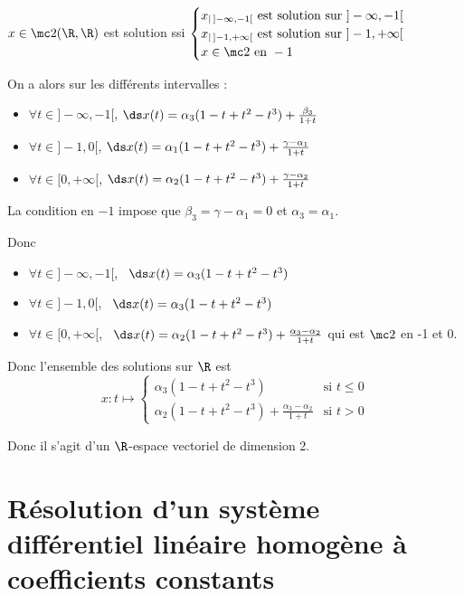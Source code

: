 \begin{exemple}
    $x \in \mc 2 (\R, \R)$ est solution ssi 
    $\begin{cases}
        x_{|\,]-\infty, -1[} \text{ est solution sur } ]-\infty, -1[ \\
        x_{|\,]-1, + \infty[} \text{ est solution sur } ]-1, +\infty[ \\
        x \in \mc 2 \text{ en } -1
    \end{cases}$

    On a alors sur les différents intervalles :
    \begin{itemize}
        \item $\forall t \in ]-\infty, -1[$, $\ds x(t) = \alpha_3 (1 - t + t^2 - t^3) + \frac{\beta_3} {1 + t}$
        \item $\forall t \in ]-1, 0[$, $\ds x(t) = \alpha_1 (1 - t + t^2 - t^3) + \frac{\gamma - \alpha_1} {1 + t}$
        \item $\forall t \in [0, + \infty[$, $\ds x(t) = \alpha_2 (1 - t + t^2 - t^3) + \frac{\gamma - \alpha_2} {1 + t}$
    \end{itemize}
    
    La condition en $-1$ impose que $\beta_3 = \gamma - \alpha_1 = 0$ et 
    $\alpha_3 = \alpha_1$.

    Donc 
    \begin{itemize}
        \item $\forall t \in ] - \infty, -1[$, \, $\ds x(t) = \alpha_3 ( 1 - t + t^2 - t^3)$
        \item $\forall t \in ]-1, 0[$, \, $\ds x(t) = \alpha_3 (1 - t + t^2 - t^3)$
        \item $\forall t \in [0, +\infty[$, \, $\ds x(t) = \alpha_2 (1 - t + t^2 - t^3) + \frac{\alpha_3 - \alpha_2} {1 + t}$
        qui est $\mc 2$ en -1 et 0. 
    \end{itemize}

    Donc l'ensemble des solutions sur $\R$ est $$x : t \mapsto \begin{cases}
        \alpha_3 (1 - t + t^2 - t^3) & \text{si } t \leqslant 0 \\
        \alpha_2 (1 - t + t^2 - t^3) + \frac{\alpha_3 - \alpha_2} {1 + t} & \text{si } t > 0
    \end{cases}$$

    Donc il s'agit d'un $\R$-espace vectoriel de dimension 2. 
\end{exemple}

\section{Résolution d'un système différentiel linéaire homogène à coefficients constants}
